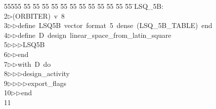 %
%
\begin{tabbing}
55555 \= 55 \= 55 \= 55 \= 55 \= 55 \= 55 \= 55 \= 55 \= 55 \= 55 \= 55 \= 55 \= \>LSQ\_5B:\\[0pt]
2\>$\triangleright$\>(ORBITER)\ v\ 8\ \\[0pt]
3\>$\triangleright$\>$\triangleright$\>define\ LSQ5B\ vector\ format\ 5\ dense\ (LSQ\_5B\_TABLE)\ end\ \\[0pt]
4\>$\triangleright$\>$\triangleright$\>define\ D\ design\ linear\_space\_from\_latin\_square\ \\[0pt]
5\>$\triangleright$\>$\triangleright$\>$\triangleright$\>LSQ5B\ \\[0pt]
6\>$\triangleright$\>$\triangleright$\>end\ \\[0pt]
7\>$\triangleright$\>$\triangleright$\>with\ D\ do\ \\[0pt]
8\>$\triangleright$\>$\triangleright$\>$\triangleright$\>design\_activity\ \\[0pt]
9\>$\triangleright$\>$\triangleright$\>$\triangleright$\>$\triangleright$\>export\_flags\ \\[0pt]
10\>$\triangleright$\>$\triangleright$\>end\\[0pt]
11\>\end{tabbing}
